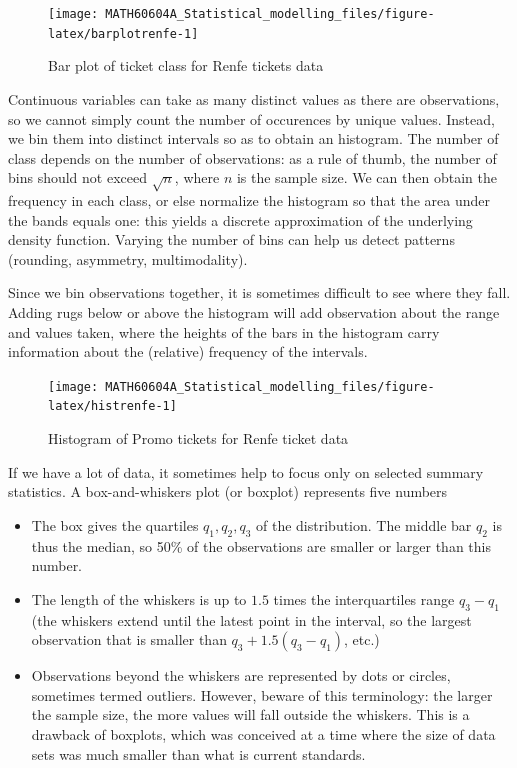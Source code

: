 \documentclass[
  11pt,
  letterpaper,
]{book}
\providecommand{\tightlist}{%
  \setlength{\itemsep}{0pt}\setlength{\parskip}{0pt}}
\theoremstyle{definition}
\theoremstyle{definition}
\theoremstyle{definition}
\theoremstyle{remark}
\begin{document}
\begin{figure}

{\centering \texttt{[image: MATH60604A\_Statistical\_modelling\_files/figure-latex/barplotrenfe-1]} 

}

\caption{Bar plot of ticket class for Renfe tickets data}\label{fig:barplotrenfe}
\end{figure}

Continuous variables can take as many distinct values as there are observations, so we cannot simply count the number of occurences by unique values. Instead, we bin them into distinct intervals so as to obtain an histogram. The number of class depends on the number of observations: as a rule of thumb, the number of bins should not exceed \(\sqrt{n}\), where \(n\) is the sample size. We can then obtain the frequency in each class, or else normalize the histogram so that the area under the bands equals one: this yields a discrete approximation of the underlying density function. Varying the number of bins can help us detect patterns (rounding, asymmetry, multimodality).

Since we bin observations together, it is sometimes difficult to see where they fall. Adding rugs below or above the histogram will add observation about the range and values taken, where the heights of the bars in the histogram carry information about the (relative) frequency of the intervals.

\begin{figure}

{\centering \texttt{[image: MATH60604A\_Statistical\_modelling\_files/figure-latex/histrenfe-1]} 

}

\caption{Histogram of Promo tickets for Renfe ticket data}\label{fig:histrenfe}
\end{figure}

If we have a lot of data, it sometimes help to focus only on selected summary statistics. A box-and-whiskers plot (or boxplot) represents five numbers

\begin{itemize}
\tightlist
\item
  The box gives the quartiles \(q_1, q_2, q_3\) of the distribution. The middle bar \(q_2\) is thus the median, so 50\% of the observations are smaller or larger than this number.
\item
  The length of the whiskers is up to \(1.5\) times the interquartiles range \(q_3-q_1\) (the whiskers extend until the latest point in the interval, so the largest observation that is smaller than \(q_3+1.5(q_3-q_1)\), etc.)
\item
  Observations beyond the whiskers are represented by dots or circles, sometimes termed outliers. However, beware of this terminology: the larger the sample size, the more values will fall outside the whiskers. This is a drawback of boxplots, which was conceived at a time where the size of data sets was much smaller than what is current standards.
\end{itemize}
\end{document}
